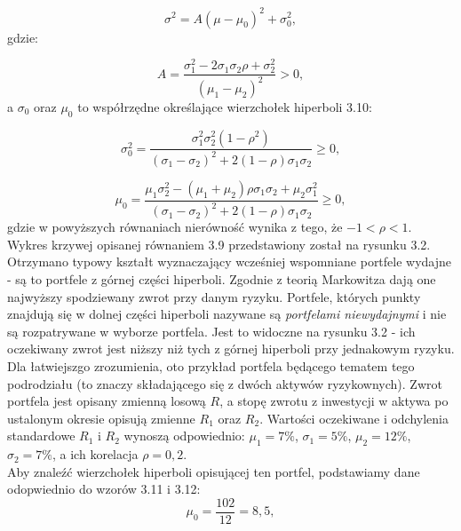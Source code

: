 \documentclass[magister]{dyplom}
\begin{document}
\begin{equation}
	\sigma^2  = A(\mu - \mu_0)^2 + \sigma_0^2,
\end{equation}
gdzie:

\begin{equation}
	A = \frac{\sigma_1^{2} - 2\sigma_1\sigma_2\rho + \sigma_2^{2}}{(\mu_1 - \mu_2)^2} > 0,
\end{equation}
a $\sigma_0$ oraz $\mu_0$ to współrzędne określające wierzchołek hiperboli 3.10:

\begin{equation}
	\sigma_0^2 = \frac{\sigma_1^{2}\sigma_2^{2}(1-\rho^2)}{(\sigma_1 - \sigma_2)^2 + 2(1-\rho)\sigma_1\sigma_2} \ge 0,
\end{equation}

\begin{equation}
	\mu_0 = \frac{\mu_1\sigma_2^2 - (\mu_1 + \mu_2)\rho\sigma_1\sigma_2 + \mu_2\sigma_1^2}{(\sigma_1 - \sigma_2)^2 + 2(1-\rho)\sigma_1\sigma_2} \ge 0,
\end{equation}
gdzie w powyższych równaniach nierówność wynika z tego, że $ -1 < \rho < 1$. \cite{book}\\

Wykres krzywej opisanej równaniem 3.9 przedstawiony został na rysunku 3.2.
Otrzymano typowy kształt wyznaczający wcześniej wspomniane portfele wydajne - są to portfele z górnej części hiperboli. Zgodnie z teorią Markowitza dają one najwyższy spodziewany zwrot przy danym ryzyku. Portfele, których punkty znajdują się w dolnej części hiperboli nazywane są \textit{portfelami niewydajnymi} i nie są rozpatrywane w wyborze portfela. Jest to widoczne na rysunku 3.2 - ich oczekiwany zwrot jest niższy niż tych z górnej hiperboli przy jednakowym ryzyku.\\

Dla łatwiejszgo zrozumienia, oto przykład portfela będącego tematem tego podrodziału (to znaczy składającego się z dwóch aktywów ryzykownych). Zwrot portfela jest opisany zmienną losową $R$, a stopę zwrotu z inwestycji w aktywa po ustalonym okresie opisują zmienne $R_1$ oraz $R_2$. Wartości oczekiwane i odchylenia standardowe $R_1$ i $R_2$ wynoszą odpowiednio: $\mu_1 = 7\%$, $\sigma_1 = 5\%$, $\mu_2 = 12\%$, $\sigma_2 = 7\%$, a ich korelacja $\rho = 0,2$.\\
Aby znaleźć wierzchołek hiperboli opisującej ten portfel, podstawiamy dane odopwiednio do wzorów 3.11 i 3.12:
\begin{equation}
	\mu_0 = \frac{102}{12} = 8,5,
\end{equation}
\end{document}
